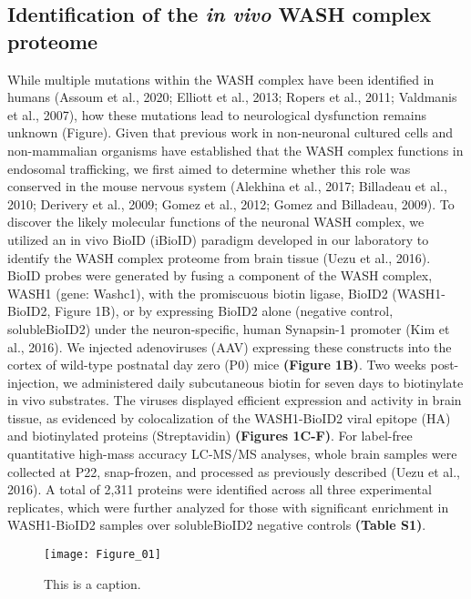 
\subsection{Identification of the \textit{in vivo} WASH complex proteome}

While multiple mutations within the WASH complex have been identified in humans 
(Assoum et al., 2020; Elliott et al., 2013; Ropers et al., 2011; 
Valdmanis et al., 2007), how these mutations lead to neurological
dysfunction remains unknown (Figure). Given that previous work in
non-neuronal cultured cells and non-mammalian organisms have established that
the WASH complex functions in endosomal trafficking, we first aimed to determine
whether this role was conserved in the mouse nervous system (Alekhina et al.,
2017; Billadeau et al., 2010; Derivery et al., 2009; Gomez et al., 2012; Gomez
and Billadeau, 2009). To discover the likely molecular functions of the neuronal
WASH complex, we utilized an in vivo BioID (iBioID) paradigm developed in our
laboratory to identify the WASH complex proteome from brain tissue (Uezu et al.,
2016). BioID probes were generated by fusing a component of the WASH complex,
WASH1 (gene: Washc1), with the promiscuous biotin ligase, BioID2 (WASH1-BioID2,
Figure 1B), or by expressing BioID2 alone (negative control, solubleBioID2)
under the neuron-specific, human Synapsin-1 promoter (Kim et al., 2016). We
injected adenoviruses (AAV) expressing these constructs into the cortex of
wild-type postnatal day zero (P0) mice \textbf{(Figure 1B)}. Two weeks post-injection, we
administered daily subcutaneous biotin for seven days to biotinylate in vivo
substrates. The viruses displayed efficient expression and activity in brain
tissue, as evidenced by colocalization of the WASH1-BioID2 viral epitope (HA)
and biotinylated proteins (Streptavidin) \textbf{(Figures 1C-F)}. For label-free
quantitative high-mass accuracy LC-MS/MS analyses, whole brain samples were
collected at P22, snap-frozen, and processed as previously described (Uezu et
al., 2016). A total of 2,311 proteins were identified across all three
experimental replicates, which were further analyzed for those with significant
enrichment in WASH1-BioID2 samples over solubleBioID2 negative controls 
\textbf{(Table S1)}. 

\begin{figure}
\begin{fullwidth}
\texttt{[image: Figure\_01]}
	\caption{This is a caption.}
\label{fig:fullwidth}
\end{fullwidth}
\end{figure}

